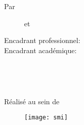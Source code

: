 \begin{center}
\textrm{Par}\\
\vskip0.3cm
{
    {%
        \begin{center}
            \large\textbf{\@author}~~~~~ et ~~~~~
            \large\textbf{\@secondAuthor}
        \end{center}
    }
    {\Large\textbf{\@author}}%
}
\vskip12mm


\begin{changemargin}{-9mm}{0cm}
\begin{minipage}[l]{1.1\columnwidth}
\begin{tcolorbox}[colframe=isiBlue,colback=white,boxrule=0pt,toprule=3pt,bottomrule=3pt,arc=0pt,top=0mm,right=0mm,left=0mm,bottom=0mm,boxsep=0.5mm]{
    \begin{tcolorbox}[colframe=isiBlue,colback=white, boxrule=0pt,toprule=1pt,bottomrule=1pt,arc=0pt,enlarge bottom by=-0.9mm, auto outer arc]
        \centering
        {\huge\textbf{\@title}}
    \end{tcolorbox}
}
\end{tcolorbox}
\end{minipage}
\end{changemargin}

\end{center}
\vskip8mm%

\begin{center}
\large
\begin{minipage}[c]{0.28\columnwidth}
Encadrant professionnel:\\
Encadrant académique:
\end{minipage}
\hfill
\begin{minipage}[c]{0.42\columnwidth}
\textbf{\@proFramerName}\\
\textbf{\@academicFramerName}
\end{minipage}
\hfill
\begin{minipage}[c]{0.26\columnwidth}
\@proFramerSpeciality\\
\@academicFramerSpeciality
\end{minipage}
\end{center}
\vskip16mm

\begin{center}
\large
Réalisé au sein de \@companyName\\
\begin{figure}[h]
\centering
\texttt{[image: smi]}
\end{figure}
\end{center}

\afterpage{\blankpage}